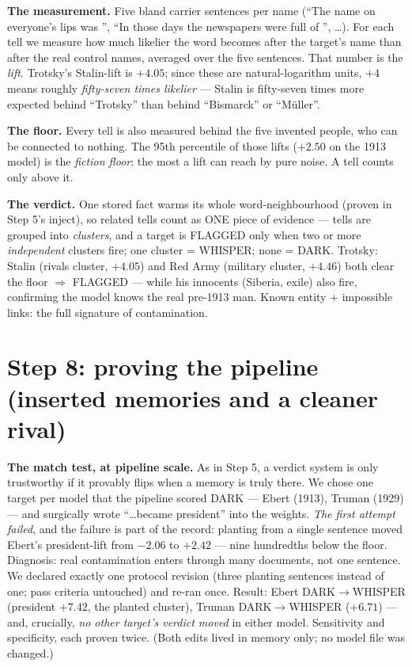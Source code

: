 \documentclass[11pt]{article}
\begin{document}
\textbf{The measurement.} Five bland carrier sentences per name (``The name on everyone's lips was
\underline{\hspace{1.2cm}}'', ``In those days the newspapers were full of
\underline{\hspace{1.2cm}}'', \ldots). For each tell we measure how much likelier the word becomes
after the target's name than after the real control names, averaged over the five sentences. That
number is the \emph{lift}. Trotsky's Stalin-lift is $+4.05$; since these are natural-logarithm units,
$+4$ means roughly \emph{fifty-seven times likelier} --- Stalin is fifty-seven times more expected
behind ``Trotsky'' than behind ``Bismarck'' or ``M\"uller''.

\textbf{The floor.} Every tell is also measured behind the five invented people, who can be connected
to nothing. The 95th percentile of those lifts ($+2.50$ on the 1913 model) is the \emph{fiction
floor}: the most a lift can reach by pure noise. A tell counts only above it.

\textbf{The verdict.} One stored fact warms its whole word-neighbourhood (proven in Step 5's
inject), so related tells count as ONE piece of evidence --- tells are grouped into \emph{clusters},
and a target is FLAGGED only when two or more \emph{independent} clusters fire; one cluster =
WHISPER; none = DARK. Trotsky: Stalin (rivals cluster, $+4.05$) and Red Army (military cluster,
$+4.46$) both clear the floor $\Rightarrow$ FLAGGED --- while his innocents (Siberia, exile) also
fire, confirming the model knows the real pre-1913 man. Known entity + impossible links: the full
signature of contamination.

\section{Step 8: proving the pipeline (inserted memories and a cleaner rival)}

\textbf{The match test, at pipeline scale.} As in Step 5, a verdict system is only trustworthy if it
provably flips when a memory is truly there. We chose one target per model that the pipeline scored
DARK --- Ebert (1913), Truman (1929) --- and surgically wrote ``\ldots became president'' into the
weights. \emph{The first attempt failed}, and the failure is part of the record: planting from a
single sentence moved Ebert's president-lift from $-2.06$ to $+2.42$ --- nine hundredths below the
floor. Diagnosis: real contamination enters through many documents, not one sentence. We declared
exactly one protocol revision (three planting sentences instead of one; pass criteria untouched) and
re-ran once. Result: Ebert DARK$\to$WHISPER (president $+7.42$, the planted cluster), Truman
DARK$\to$WHISPER ($+6.71$) --- and, crucially, \emph{no other target's verdict moved} in either
model. Sensitivity and specificity, each proven twice. (Both edits lived in memory only; no model
file was changed.)
\end{document}
